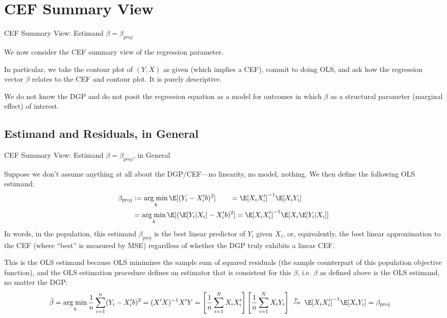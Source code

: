 \documentclass[aspectratio=169, handout]{beamer}
\DeclareMathOperator*{\argmin}{arg\;min}
\newcommand{\pto}{\xrightarrow{p}}
\newcommand{\sumiN}{\sum^N_{i=1}}
\begin{document}
\section{CEF Summary View}


{\footnotesize
\begin{frame}{CEF Summary View: Estimand $\beta=\beta_{{proj}}$}

We now consider the CEF summary view of the regression parameter.

In particular, we take the contour plot of $(Y,X)$ as given (which
implies a CEF), commit to doing OLS, and ask how the regression vector
$\beta$ relates to the CEF and contour plot.
It is purely descriptive.

We do not know the DGP and do not posit the regression equation as
a model for outcomes in which $\beta$ as a structural parameter
(marginal effect) of interest.
\end{frame}
}



\subsection{Estimand and Residuals, in General}

{\scriptsize
\begin{frame}{CEF Summary View: Estimand $\beta=\beta_{{proj}}$, in General}

Suppose we don't assume anything at all about the DGP/CEF---no
linearity, no model, nothing.
We then define the following OLS estimand:
\begin{align*}
  \beta_\text{proj}
  &:=
  \argmin_b
  \E[(Y_i-X_i'b)^2]
  \qquad
  =
  \E[X_iX_i']^{-1}\E[X_iY_i]
  \\
  &
  =
  \argmin_b
  \E[(\E[Y_i|X_i]-X_i'b)^2]
  =
  \E[X_iX_i']^{-1}\E[X_i\E[Y_i|X_i]]
\end{align*}
In words, in the population, this estimand $\beta_{\text{proj}}$ is the
\alert{best linear predictor} of $Y_i$ given $X_i$, or, equivalently,
the
\alert{best linear approximation to the CEF} (where ``best'' is measured
by MSE) \alert{regardless} of whether the DGP truly exhibits a linear
CEF.

This is the OLS estimand because OLS minimizes the sample sum of squared
residuals (the sample counterpart of this population objective
function), and the OLS estimation procedure defines an estimator that is
\alert{consistent} for this $\beta$, i.e. $\beta$ as defined above is
the OLS estimand, no matter the DGP:
\begin{align*}
  \hat{\beta}
  &=
  \argmin_b
  \frac{1}{n}
  \sum_{i=1}^n
  (Y_i-X_i'b)^2
  =
  (X'X)^{-1}X'Y
  =
  \left[
    \frac{1}{n}
    \sumiN
    X_iX_i'
  \right]
  \left[
    \frac{1}{n}
    \sumiN
    X_iY_i
  \right]
  \;
  \pto
  \;
  \E[X_iX_i']^{-1}\E[X_iY_i]
  =
  \beta_\text{proj}
\end{align*}
\end{frame}
}
\end{document}
